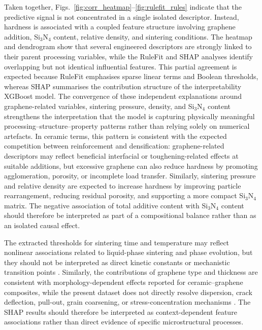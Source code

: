 \documentclass[pdflatex,sn-mathphys-num]{sn-jnl}%
\newif\ifrevmarks%
\newcommand{\revmark}[1]{\ifrevmarks\textcolor{revblue}{#1}\else#1\fi}%
\theoremstyle{thmstyleone}%
\theoremstyle{thmstyletwo}%
\theoremstyle{thmstylethree}%
\begin{document}
\revmark{Taken together, Figs.~\ref{fig:corr_heatmap}--\ref{fig:rulefit_rules} indicate that the predictive signal is not concentrated in a single isolated descriptor. Instead, hardness is associated with a coupled feature structure involving graphene addition, Si$_3$N$_4$ content, relative density, and sintering conditions. The heatmap and dendrogram show that several engineered descriptors are strongly linked to their parent processing variables, while the RuleFit and SHAP analyses identify overlapping but not identical influential features. This partial agreement is expected because RuleFit emphasises sparse linear terms and Boolean thresholds, whereas SHAP summarises the contribution structure of the interpretability XGBoost model. The convergence of these independent explanations around graphene-related variables, sintering pressure, density, and Si$_3$N$_4$ content strengthens the interpretation that the model is capturing physically meaningful processing--structure--property patterns rather than relying solely on numerical artefacts. In ceramic terms, this pattern is consistent with the expected competition between reinforcement and densification: graphene-related descriptors may reflect beneficial interfacial or toughening-related effects at suitable additions, but excessive graphene can also reduce hardness by promoting agglomeration, porosity, or incomplete load transfer. Similarly, sintering pressure and relative density are expected to increase hardness by improving particle rearrangement, reducing residual porosity, and supporting a more compact Si$_3$N$_4$ matrix. The negative association of total additive content with Si$_3$N$_4$ content should therefore be interpreted as part of a compositional balance rather than as an isolated causal effect.}

The extracted thresholds for sintering time and temperature may reflect nonlinear associations related to liquid-phase sintering and phase evolution, but they should not be interpreted as direct kinetic constants or mechanistic transition points \cite{german2009liquid}. Similarly, the contributions of graphene type and thickness are consistent with morphology-dependent effects reported for ceramic--graphene composites, while the present dataset does not directly resolve dispersion, crack deflection, pull-out, grain coarsening, or stress-concentration mechanisms \cite{miranzo2017bulk,ramirez2014extraordinary}. The SHAP results should therefore be interpreted as context-dependent feature associations rather than direct evidence of specific microstructural processes.
\end{document}
